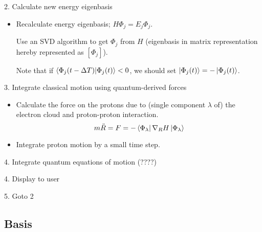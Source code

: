 \documentclass[12pt]{article}
\newcommand{\eigbasis}[0]{[\Phi_j]}
\begin{document}
2. Calculate new energy eigenbasis
\begin{itemize}
    \item Recalculate energy eigenbasis; $H\Phi_j = E_j\Phi_j$.

        Use an SVD algorithm to get $\Phi_j$ from $H$ (eigenbasis in matrix representation hereby represented as $\eigbasis$).

        Note that if $\bra{\Phi_j(t - \Delta T)}\ket{\Phi_j(t)} < 0$, we should set $\ket{\Phi_j(t)} = -\ket{\Phi_j(t)}$.
\end{itemize}

3. Integrate classical motion using quantum-derived forces
\begin{itemize}
    \item Calculate the force on the protons due to (single component $\lambda$ of) the electron cloud and proton-proton interaction.
        \[ m\ddot{R} = F = -\bra{\Phi_\lambda}\nabla_R H\ket{\Phi_\lambda} \]

    \item Integrate proton motion by a small time step.
\end{itemize}

4. Integrate quantum equations of motion
(????)

4. Display to user

5. Goto 2

\subsection{Basis}
\end{document}

